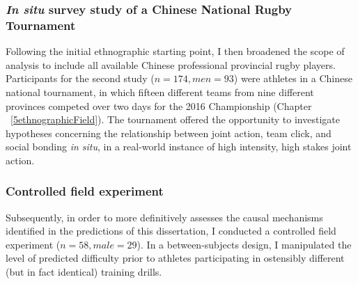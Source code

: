 \begin{CJK}{UTF8}{gbsn}
\subsubsection{\textit{In situ} survey study of a Chinese National
 Rugby Tournament}
  Following the initial ethnographic starting point, I then broadened the scope of analysis to include all available Chinese professional provincial rugby players. Participants for the second study ($n = 174, men = 93$) were athletes in a Chinese national tournament, in which fifteen different teams from nine different provinces competed over two days for the 2016 Championship (Chapter ~\ref{5ethnographicField}).  The tournament offered the opportunity to investigate hypotheses concerning the relationship between joint action, team click, and social bonding \textit{in situ}, in a real-world instance of high intensity, high stakes joint action.

\subsubsection{Controlled field experiment}
  Subsequently, in order to more definitively assesses the causal mechanisms identified in the predictions of this dissertation, I conducted a controlled field experiment ($n = 58, male = 29$). In a between-subjects design, I manipulated the level of predicted difficulty prior to athletes participating in ostensibly different (but in fact identical) training drills.









\end{CJK}
